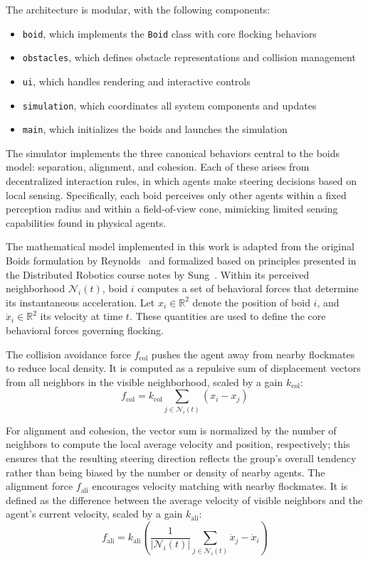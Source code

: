 \documentclass[12pt]{article}
\begin{document}
The architecture is modular, with the following components:
\begin{itemize}[nosep]
    \item \texttt{boid}, which implements the \texttt{Boid} class with core flocking behaviors
    \item \texttt{obstacles}, which defines obstacle representations and collision management
    \item \texttt{ui}, which handles rendering and interactive controls
    \item \texttt{simulation}, which coordinates all system components and updates
    \item \texttt{main}, which initializes the boids and launches the simulation
\end{itemize}

The simulator implements the three canonical behaviors central to the boids model: separation, alignment, and cohesion. Each of these arises from decentralized interaction rules, in which agents make steering decisions based on local sensing. Specifically, each boid perceives only other agents within a fixed perception radius and within a field-of-view cone, mimicking limited sensing capabilities found in physical agents.

The mathematical model implemented in this work is adapted from the original Boids formulation by Reynolds~\cite{reynolds1987flocks} and formalized based on principles presented in the Distributed Robotics course notes by Sung~\cite{sung2025distributed}. Within its perceived neighborhood \(\mathcal{N}_i(t)\), boid \(i\) computes a set of behavioral forces that determine its instantaneous acceleration. Let \(x_i \in \mathbb{R}^2\) denote the position of boid \(i\), and \(\dot{x}_i \in \mathbb{R}^2\) its velocity at time \(t\). These quantities are used to define the core behavioral forces governing flocking.

The collision avoidance force \(f_{\text{col}}\) pushes the agent away from nearby flockmates to reduce local density. It is computed as a repulsive sum of displacement vectors from all neighbors in the visible neighborhood, scaled by a gain \(k_{\text{col}}\):
\begin{equation} f_\text{col} = k_\text{col} \sum_{j \in \mathcal{N}_i(t)} (x_i - x_j) \end{equation}

For alignment and cohesion, the vector sum is normalized by the number of neighbors to compute the local average velocity and position, respectively; this ensures that the resulting steering direction reflects the group's overall tendency rather than being biased by the number or density of nearby agents. The alignment force \(f_\text{ali}\) encourages velocity matching with nearby flockmates. It is defined as the difference between the average velocity of visible neighbors and the agent’s current velocity, scaled by a gain \(k_\text{ali}\): 
\begin{equation} f_\text{ali} = k_\text{ali} \left( \frac{1}{|\mathcal{N}_i(t)|} \sum_{j \in \mathcal{N}_i(t)} \dot{x}_j - \dot{x}_i \right) \end{equation}
\end{document}
